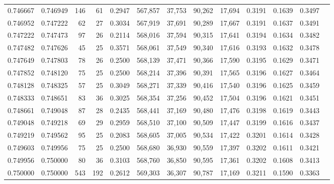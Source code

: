 \begin{tabular}{rrrrrrrrrrrrr}
0.746667 & 0.746949 &    146 &    61 &                                     0.2947 & 567,857 &  37,753 &  90,262 &  17,694 & 0.3191 & 0.1639 & 0.3497 \\
0.746952 & 0.747222 &     62 &    27 &                                     0.3034 & 567,919 &  37,691 &  90,289 &  17,667 & 0.3191 & 0.1637 & 0.3491 \\
0.747222 & 0.747473 &     97 &    26 &                                     0.2114 & 568,016 &  37,594 &  90,315 &  17,641 & 0.3194 & 0.1634 & 0.3482 \\
0.747482 & 0.747626 &     45 &    25 &                                     0.3571 & 568,061 &  37,549 &  90,340 &  17,616 & 0.3193 & 0.1632 & 0.3478 \\
0.747649 & 0.747803 &     78 &    26 &                                     0.2500 & 568,139 &  37,471 &  90,366 &  17,590 & 0.3195 & 0.1629 & 0.3471 \\
0.747852 & 0.748120 &     75 &    25 &                                     0.2500 & 568,214 &  37,396 &  90,391 &  17,565 & 0.3196 & 0.1627 & 0.3464 \\
0.748128 & 0.748325 &     57 &    25 &                                     0.3049 & 568,271 &  37,339 &  90,416 &  17,540 & 0.3196 & 0.1625 & 0.3459 \\
0.748333 & 0.748651 &     83 &    36 &                                     0.3025 & 568,354 &  37,256 &  90,452 &  17,504 & 0.3196 & 0.1621 & 0.3451 \\
0.748661 & 0.749048 &     87 &    28 &                                     0.2435 & 568,441 &  37,169 &  90,480 &  17,476 & 0.3198 & 0.1619 & 0.3443 \\
0.749048 & 0.749218 &     69 &    29 &                                     0.2959 & 568,510 &  37,100 &  90,509 &  17,447 & 0.3199 & 0.1616 & 0.3437 \\
0.749219 & 0.749562 &     95 &    25 &                                     0.2083 & 568,605 &  37,005 &  90,534 &  17,422 & 0.3201 & 0.1614 & 0.3428 \\
0.749603 & 0.749956 &     75 &    25 &                                     0.2500 & 568,680 &  36,930 &  90,559 &  17,397 & 0.3202 & 0.1611 & 0.3421 \\
0.749956 & 0.750000 &     80 &    36 &                                     0.3103 & 568,760 &  36,850 &  90,595 &  17,361 & 0.3202 & 0.1608 & 0.3413 \\
0.750000 & 0.750000 &    543 &   192 &                                     0.2612 & 569,303 &  36,307 &  90,787 &  17,169 & 0.3211 & 0.1590 & 0.3363 \\

\end{tabular}
